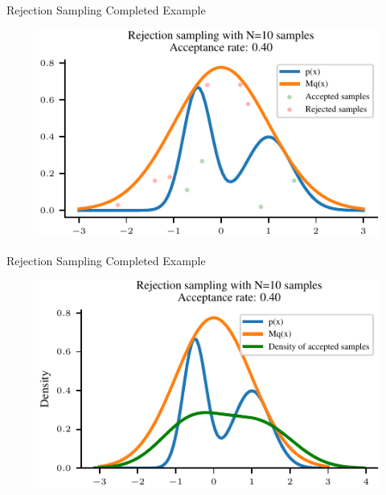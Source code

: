 \documentclass[handout]{beamer}
\begin{document}
    \begin{frame}{Rejection Sampling Completed Example}
        \begin{figure}
            \centering
            \includegraphics{../figures/sampling/rejection-sampling-N10-False.pdf}
        \end{figure}
        
    \end{frame}

    \begin{frame}{Rejection Sampling Completed Example}
        \begin{figure}
            \centering
            \includegraphics{../figures/sampling/rejection-sampling-N10-True.pdf}
        \end{figure}
        
    \end{frame}
\end{document}
